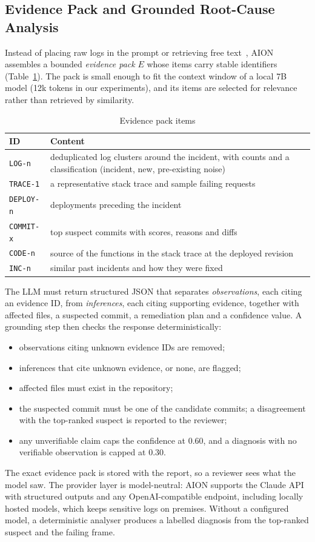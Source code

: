 \documentclass[conference]{IEEEtran}
\begin{document}
\subsection{Evidence Pack and Grounded Root-Cause Analysis}
\label{sec:rca}
Instead of placing raw logs in the prompt or retrieving free text~\cite{lewis2020rag}, AION assembles a bounded \emph{evidence pack} $E$ whose items carry stable identifiers (Table~\ref{tab:evidence}). The pack is small enough to fit the context window of a local 7B model (12k tokens in our experiments), and its items are selected for relevance rather than retrieved by similarity.

\begin{table}[t]
\centering
\caption{Evidence pack items}
\label{tab:evidence}
\footnotesize
\begin{tabular}{@{}p{1.4cm}p{6.3cm}@{}}
\toprule
ID & Content \\
\midrule
\texttt{LOG-n} & deduplicated log clusters around the incident, with counts and a classification (incident, new, pre-existing noise) \\
\texttt{TRACE-1} & a representative stack trace and sample failing requests \\
\texttt{DEPLOY-n} & deployments preceding the incident \\
\texttt{COMMIT-x} & top suspect commits with scores, reasons and diffs \\
\texttt{CODE-n} & source of the functions in the stack trace at the deployed revision \\
\texttt{INC-n} & similar past incidents and how they were fixed \\
\bottomrule
\end{tabular}
\end{table}

The LLM must return structured JSON that separates \emph{observations}, each citing an evidence ID, from \emph{inferences}, each citing supporting evidence, together with affected files, a suspected commit, a remediation plan and a confidence value. A grounding step then checks the response deterministically:
\begin{itemize}
\item observations citing unknown evidence IDs are removed;
\item inferences that cite unknown evidence, or none, are flagged;
\item affected files must exist in the repository;
\item the suspected commit must be one of the candidate commits; a disagreement with the top-ranked suspect is reported to the reviewer;
\item any unverifiable claim caps the confidence at 0.60, and a diagnosis with no verifiable observation is capped at 0.30.
\end{itemize}
The exact evidence pack is stored with the report, so a reviewer sees what the model saw. The provider layer is model-neutral: AION supports the Claude API with structured outputs and any OpenAI-compatible endpoint, including locally hosted models, which keeps sensitive logs on premises. Without a configured model, a deterministic analyser produces a labelled diagnosis from the top-ranked suspect and the failing frame.
\end{document}
